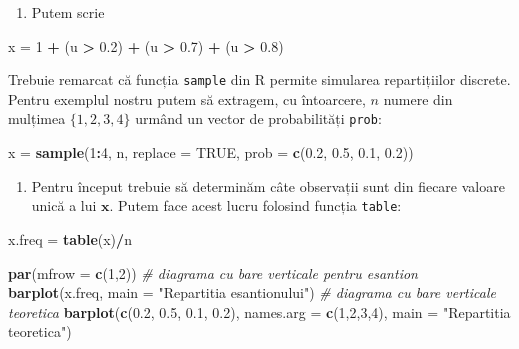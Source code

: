 \documentclass[]{article}
\newenvironment{Shaded}{\begin{snugshade}}{\end{snugshade}}
\newcommand{\KeywordTok}[1]{\textcolor[rgb]{0.13,0.29,0.53}{\textbf{#1}}}
\newcommand{\DataTypeTok}[1]{\textcolor[rgb]{0.13,0.29,0.53}{#1}}
\newcommand{\DecValTok}[1]{\textcolor[rgb]{0.00,0.00,0.81}{#1}}
\newcommand{\FloatTok}[1]{\textcolor[rgb]{0.00,0.00,0.81}{#1}}
\newcommand{\StringTok}[1]{\textcolor[rgb]{0.31,0.60,0.02}{#1}}
\newcommand{\CommentTok}[1]{\textcolor[rgb]{0.56,0.35,0.01}{\textit{#1}}}
\newcommand{\OtherTok}[1]{\textcolor[rgb]{0.56,0.35,0.01}{#1}}
\newcommand{\OperatorTok}[1]{\textcolor[rgb]{0.81,0.36,0.00}{\textbf{#1}}}
\newcommand{\NormalTok}[1]{#1}
\providecommand{\tightlist}{%
  \setlength{\itemsep}{0pt}\setlength{\parskip}{0pt}}
\begin{document}
\begin{enumerate}
\def\labelenumi{\arabic{enumi}.}
\setcounter{enumi}{1}
\tightlist
\item
  Putem scrie
\end{enumerate}

\begin{Shaded}
\begin{Highlighting}[]
\NormalTok{x =}\StringTok{ }\DecValTok{1} \OperatorTok{+}\StringTok{ }\NormalTok{(u }\OperatorTok{>}\StringTok{ }\FloatTok{0.2}\NormalTok{) }\OperatorTok{+}\StringTok{ }\NormalTok{(u }\OperatorTok{>}\StringTok{ }\FloatTok{0.7}\NormalTok{) }\OperatorTok{+}\StringTok{ }\NormalTok{(u }\OperatorTok{>}\StringTok{ }\FloatTok{0.8}\NormalTok{)}
\end{Highlighting}
\end{Shaded}

Trebuie remarcat că funcția \texttt{sample} din R permite simularea
repartițiilor discrete. Pentru exemplul nostru putem să extragem, cu
întoarcere, \(n\) numere din mulțimea \(\{1,2,3,4\}\) urmând un vector
de probabilități \texttt{prob}:

\begin{Shaded}
\begin{Highlighting}[]
\NormalTok{x =}\StringTok{ }\KeywordTok{sample}\NormalTok{(}\DecValTok{1}\OperatorTok{:}\DecValTok{4}\NormalTok{, n, }\DataTypeTok{replace =} \OtherTok{TRUE}\NormalTok{, }
           \DataTypeTok{prob =} \KeywordTok{c}\NormalTok{(}\FloatTok{0.2}\NormalTok{, }\FloatTok{0.5}\NormalTok{, }\FloatTok{0.1}\NormalTok{, }\FloatTok{0.2}\NormalTok{))}
\end{Highlighting}
\end{Shaded}

\begin{enumerate}
\def\labelenumi{\arabic{enumi}.}
\setcounter{enumi}{2}
\tightlist
\item
  Pentru început trebuie să determinăm câte observații sunt din fiecare
  valoare unică a lui \(\boldsymbol x\). Putem face acest lucru folosind
  funcția \texttt{table}:
\end{enumerate}

\begin{Shaded}
\begin{Highlighting}[]
\NormalTok{x.freq =}\StringTok{ }\KeywordTok{table}\NormalTok{(x)}\OperatorTok{/}\NormalTok{n}

\KeywordTok{par}\NormalTok{(}\DataTypeTok{mfrow =} \KeywordTok{c}\NormalTok{(}\DecValTok{1}\NormalTok{,}\DecValTok{2}\NormalTok{))}
\CommentTok{# diagrama cu bare verticale pentru esantion}
\KeywordTok{barplot}\NormalTok{(x.freq, }\DataTypeTok{main =} \StringTok{"Repartitia esantionului"}\NormalTok{)}
\CommentTok{# diagrama cu bare verticale teoretica}
\KeywordTok{barplot}\NormalTok{(}\KeywordTok{c}\NormalTok{(}\FloatTok{0.2}\NormalTok{, }\FloatTok{0.5}\NormalTok{, }\FloatTok{0.1}\NormalTok{, }\FloatTok{0.2}\NormalTok{), }\DataTypeTok{names.arg =} \KeywordTok{c}\NormalTok{(}\DecValTok{1}\NormalTok{,}\DecValTok{2}\NormalTok{,}\DecValTok{3}\NormalTok{,}\DecValTok{4}\NormalTok{),}
        \DataTypeTok{main =} \StringTok{"Repartitia teoretica"}\NormalTok{)}
\end{Highlighting}
\end{Shaded}
\end{document}
